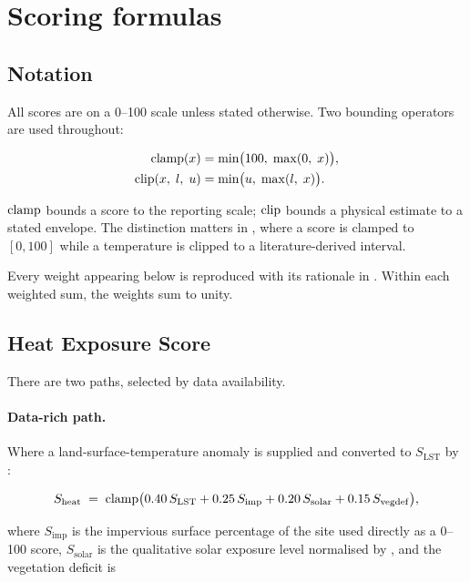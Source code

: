 \section{Scoring formulas}
\label{sec:formulas}

\subsection{Notation}

All scores are on a \numrange{0}{100} scale unless stated otherwise. Two
bounding operators are used throughout:

\begin{align}
\operatorname{clamp}\!\left(x\right)          &= \min\bigl(100,\; \max(0,\; x)\bigr), \\
\operatorname{clip}\!\left(x,\;l,\;u\right)     &= \min\bigl(u,\; \max(l,\; x)\bigr).
\end{align}

$\operatorname{clamp}$ bounds a score to the reporting scale; $\operatorname{clip}$ bounds a physical
estimate to a stated envelope. The distinction matters in
, where a score is clamped to $[0,100]$ while a temperature
is clipped to a literature-derived interval.

Every weight appearing below is reproduced with its rationale in
. Within each weighted sum, the weights sum to unity.

\subsection{Heat Exposure Score}
\label{sec:heat-exposure}

There are two paths, selected by data availability.

\paragraph{Data-rich path.} Where a land-surface-temperature anomaly is
supplied and converted to $S_{\mathrm{LST}}$ by :

\begin{equation}
\label{eq:heat-exposure-rich}
S_{\mathrm{heat}} \;=\; \operatorname{clamp}\bigl(
  0.40\,S_{\mathrm{LST}}
+ 0.25\,S_{\mathrm{imp}}
+ 0.20\,S_{\mathrm{solar}}
+ 0.15\,S_{\mathrm{vegdef}}\bigr),
\end{equation}

where $S_{\mathrm{imp}}$ is the impervious surface percentage of the site used
directly as a \numrange{0}{100} score, $S_{\mathrm{solar}}$ is the qualitative
solar exposure level normalised by , and the vegetation
deficit is

